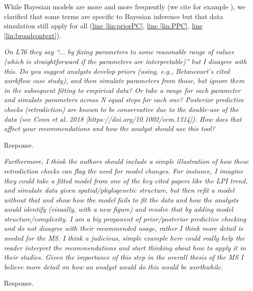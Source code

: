 \documentclass[11pt,letter]{article}
\begin{document}
While Bayesian models are more and more frequently (we cite for example ), we clarified that some terms are specific to Bayesian inference but that data simulation still apply for all (\href{file:forecastflows_r1\#lintarget:priorPC}{line \ref*{lin:priorPC}}, \href{file:forecastflows_r1\#lintarget:PPC}{line \ref*{lin:PPC}}, \href{file:forecastflows_r1\#lintarget:broadcontext}{line \ref*{lin:broadcontext}}).

\begin{mybox}
\emph{On L76 they say “... by fixing parameters to some reasonable range of values (which is straightforward if the parameters are interpretable)” but I disagree with this. Do you suggest analysts develop priors (using, e.g., Betancourt’s cited workflow case study), and then simulate parameters from those, but ignore them in the subsequent fitting to empirical data? Or take a range for each parameter and simulate parameters across N equal steps for each one? Posterior predictive checks (retrodiction) are known to be conservative due to the double-use of the data (see Conn et al. 2018 [https://doi.org/10.1002/ecm.1314]). How does that affect your recommendations and how the analyst should use this tool?}
\end{mybox}

Response.

\begin{mybox}
\emph{Furthermore, I think the authors should include a simple illustration of how these retrodiction checks can flag the need for model changes. For instance, I imagine they could take a fitted model from one of the key cited papers like the LPI trend, and simulate data given spatial/phylogenetic structure, but then refit a model without that and show how the model fails to fit the data and how the analysts would identify (visually, with a new figure) and resolve that by adding model structure/complexity. I am a big proponent of prior/posterior predictive checking and do not disagree with their recommended usage, rather I think more detail is needed for the MS. I think a judicious, simple example here could really help the reader interpret the recommendations and start thinking about how to apply it in their studies. Given the importance of this step in the overall thesis of the MS I believe more detail on how an analyst would do this would be worthwhile.}
\end{mybox}

Response.
\end{document}
